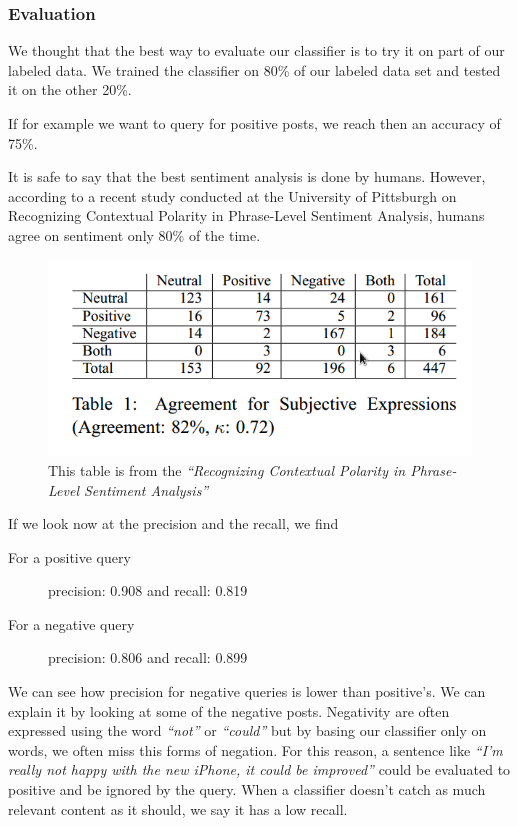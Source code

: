 \subsubsection*{Evaluation}
We thought that the best way to evaluate our classifier is to try it on part of our labeled data.
We trained the classifier on 80\% of our labeled data set and tested it on the other 20\%.

If for example we want to query for positive posts, we reach then an accuracy of 75\%.


It is safe to say that the best sentiment analysis is done by humans\cite{sentiment_analysis}. However, according to a recent
study conducted at the University of Pittsburgh on Recognizing Contextual Polarity in Phrase-Level Sentiment Analysis\cite{polarity},
humans agree on sentiment only 80\% of the time.

\begin{figure}[h]
\centering
\includegraphics[scale=.5]{images/sent1.png}
\caption{This table is from the \textit{``Recognizing Contextual Polarity in Phrase-Level Sentiment Analysis''}}
\end{figure}

If we look now at the precision and the recall, we find

\begin{description}
 \item[For a positive query]

  precision: 0.908 and
  recall: 0.819


 \item[For a negative query]

  precision: 0.806 and
  recall: 0.899

\end{description}


We can see how precision for negative queries is lower than positive’s. We can explain it by looking at some of the negative posts. 
Negativity are often expressed using the word \textit{“not”} or \textit{``could''} but by basing our classifier only on words, we often miss this forms of negation. 
For this reason, a sentence like \textit{“I’m really not happy with the new iPhone, it could be improved”} could be evaluated to positive and be 
ignored by the query. When a classifier doesn’t catch as much relevant content as it should, we say it has a low recall.


